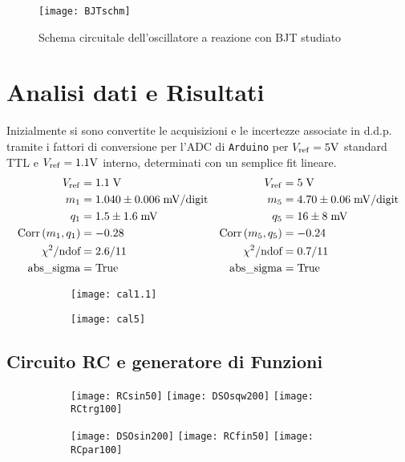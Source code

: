 \documentclass{article}[a4paper, oneside, 11pt]
\begin{document}
\begin{figure}[!htp]
	\centering 
		\texttt{[image: BJTschm]}
	\caption{Schema circuitale dell'oscillatore a reazione con BJT
	studiato\label{schm: BJT}}
\end{figure}
\section{Analisi dati e Risultati}
Inizialmente si sono convertite le acquisizioni e le incertezze associate in
d.d.p. tramite i fattori di conversione per l'ADC di \verb+Arduino+ per
$V_{\rm ref} = 5 \si{\V}$ standard TTL e $V_{\rm ref} = 1.1 \si{\V}$
interno, determinati con un semplice fit lineare.
\begin{align*}
	V_{\rm ref} &= 1.1\; \rm V	&V_{\rm ref} &= 5\; \rm V \\
	m_1 &= 1.040 \pm  0.006  \; \mathrm{mV/digit} 
	& m_5  &= 4.70 \pm 0.06  \; \mathrm{mV/digit} \\
	q_1 &= 1.5 \pm 1.6  \; \si{\mV} 	
	&q_5 &= 16  \pm 8  \; \si{\mV} \\
	\corr{m_1} {q_1} &= - 0.28      &\corr{m_5}{q_5} &= - 0.24 \\
	\chi^2/\text{ndof} &= 2.6/11	&\chi^2/\text{ndof} &= 0.7/11 \\ 
	\text{abs\_sigma} &= \rm True	&\text{abs\_sigma} &= \rm True
\end{align*}

\begin{figure}[!htb]
	\centering
	\begin{subfigure}{.5\textwidth}
		\texttt{[image: cal1.1]}
	\label{fig: cal1.1}
	\end{subfigure}%
	\begin{subfigure}{.5\textwidth}
		\texttt{[image: cal5]}
	\label{fig: cal1}
	\end{subfigure}
\end{figure}

\subsection{Circuito RC e generatore di Funzioni}

\begin{figure}[!htb]
\centering
	\begin{subfigure}{.5\textwidth}
	\texttt{[image: RCsin50]}
	\texttt{[image: DSOsqw200]}
	\texttt{[image: RCtrg100]}
\label{fig: RCin}
	\end{subfigure}%
	\begin{subfigure}{.5\textwidth}
	\texttt{[image: DSOsin200]}
	\texttt{[image: RCfin50]}
	\texttt{[image: RCpar100]}
\label{fig: Rcint}
	\end{subfigure}%
\label{fig: RCall}
\end{figure}
\end{document}
